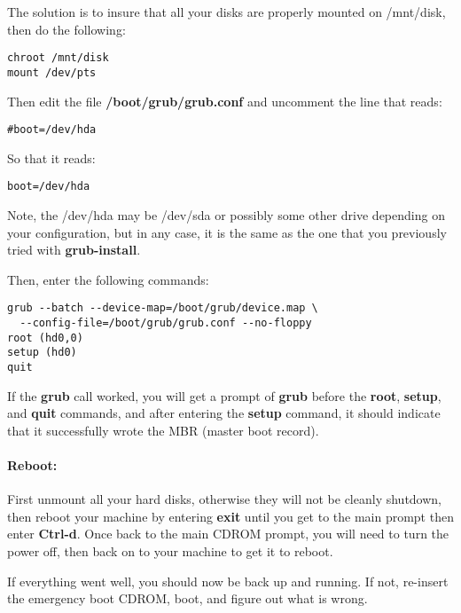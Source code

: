 The solution is to insure that all your disks are properly mounted on
/mnt/disk, then do the following:

\footnotesize
\begin{verbatim}
chroot /mnt/disk
mount /dev/pts
\end{verbatim}
\normalsize

Then edit the file {\bf /boot/grub/grub.conf} and uncomment the line
that reads:

\footnotesize
\begin{verbatim}
#boot=/dev/hda
\end{verbatim}
\normalsize

So that it reads:

\footnotesize
\begin{verbatim}
boot=/dev/hda
\end{verbatim}
\normalsize

Note, the /dev/hda may be /dev/sda or possibly some other drive depending
on your configuration, but in any case, it is the same as the one that
you previously tried with {\bf grub-install}.

Then, enter the following commands:

\footnotesize
\begin{verbatim}
grub --batch --device-map=/boot/grub/device.map \
  --config-file=/boot/grub/grub.conf --no-floppy
root (hd0,0)
setup (hd0)
quit
\end{verbatim}
\normalsize

If the {\bf grub} call worked, you will get a prompt of {\bf grub\gt{}}   
before the {\bf root}, {\bf setup}, and {\bf quit} commands, and after 
entering the {\bf setup} command, it should indicate that it successfully
wrote the MBR (master boot record).


\paragraph*{Reboot:}

First unmount all your hard disks, otherwise they will not be cleanly
shutdown, then reboot your machine by entering {\bf exit} until you get to the
main prompt then enter {\bf Ctrl-d}. Once back to the main CDROM prompt, you
will need to turn the power off, then back on to your machine to get it to
reboot. 

If everything went well, you should now be back up and running. If not,
re-insert the emergency boot CDROM, boot, and figure out what is wrong. 

\label{restore_server}
